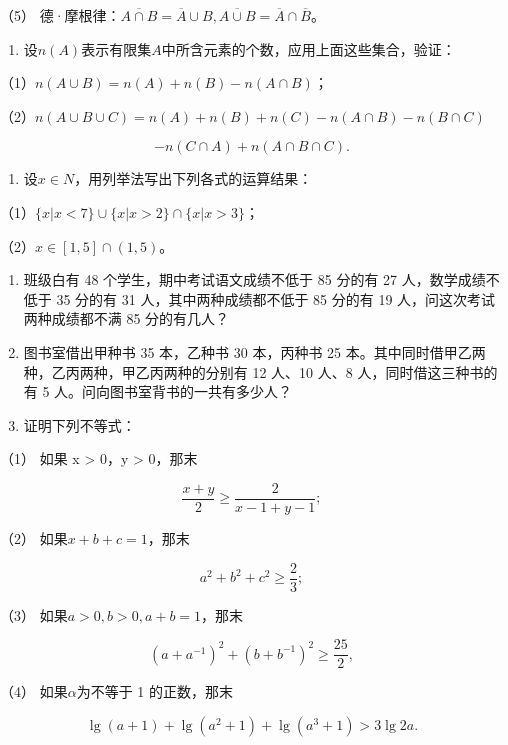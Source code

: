 （5）
德·摩根律：\(\overline{A \cap B} = \overline{A} \cup B, \overline{A \cup B} = \overline{A} \cap \overline{B}\)。

\begin{enumerate}[start=2]
\item
  设\(n(A)\)表示有限集\(A\)中所含元素的个数，应用上面这些集合，验证：
\end{enumerate}

（1）\(n(A \cup B) = n(A) + n(B) - n(A \cap B)\)；

（2）\(n(A \cup B \cup C) = n(A) + n(B) + n(C) - n(A \cap B) - n(B \cap C)\)

\[
- n (C \cap A) + n (A \cap B \cap C).
\]

\begin{enumerate}[start=3]
\item
  设\(x \in N\)，用列举法写出下列各式的运算结果：
\end{enumerate}

（1）\(\{x|x < 7\} \cup \{x|x > 2\} \cap \{x|x > 3\}\)；

（2）\(x \in [1, 5] \cap (1, 5)\)。

\begin{enumerate}[start=4]
\item
  班级白有 48 个学生，期中考试语文成绩不低于 85 分的有 27
  人，数学成绩不低于 35 分的有 31 人，其中两种成绩都不低于 85 分的有 19
  人，问这次考试两种成绩都不满 85 分的有几人？
\item
  图书室借出甲种书 35 本，乙种书 30 本，丙种书 25
  本。其中同时借甲乙两种，乙丙两种，甲乙丙两种的分别有 12 人、10 人、8
  人，同时借这三种书的有 5 人。问向图书室背书的一共有多少人？
\item
  证明下列不等式：
\end{enumerate}

（1） 如果 x \textgreater{} 0，y \textgreater{} 0，那末

\[
\frac{x + y}{2} \geqslant \frac{2}{x - 1 + y - 1};
\]

（2） 如果\(x + b + c = 1\)，那末

\[
a^{2} + b^{2} + c^{2} \geqslant \frac{2}{3};
\]

（3） 如果\(a > 0, b > 0, a + b = 1\)，那末

\[
(a + a^{- 1})^{2} + (b + b^{- 1})^{2} \geqslant \frac{25}{2},
\]

（4） 如果\(\alpha\)为不等于 1 的正数，那末

\[
\lg (a + 1) + \lg (a^{2} + 1) + \lg (a^{3} + 1) > 3 \lg 2 a.
\]

